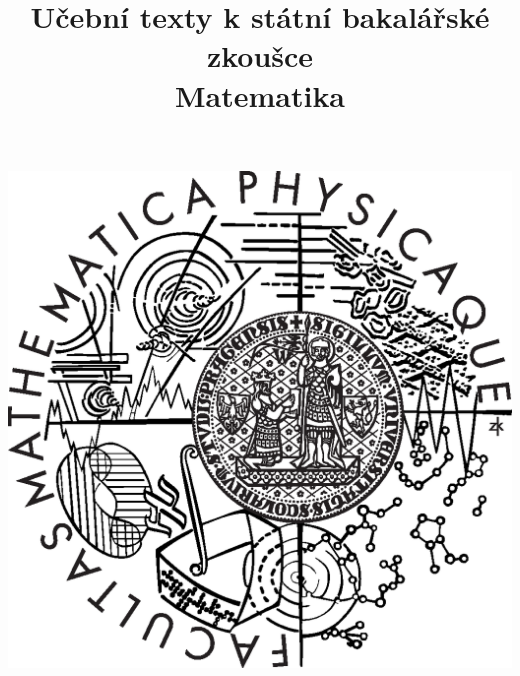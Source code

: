 \clearpage

\clearpage

\title{\LARGE Učební texty k státní bakalářské zkoušce \\ Matematika}




\maketitle

\vspace{10mm}
\includegraphics[scale=0.3]{common/logo.eps} 

\clearpage

\clearpage

\tableofcontents


\newpage

\newpage

\newpage

\newpage

\newpage

\newpage

\newpage

\newpage

\newpage

\newpage

\newpage

\newpage

\newpage

\newpage

\newpage

\newpage

\newpage



